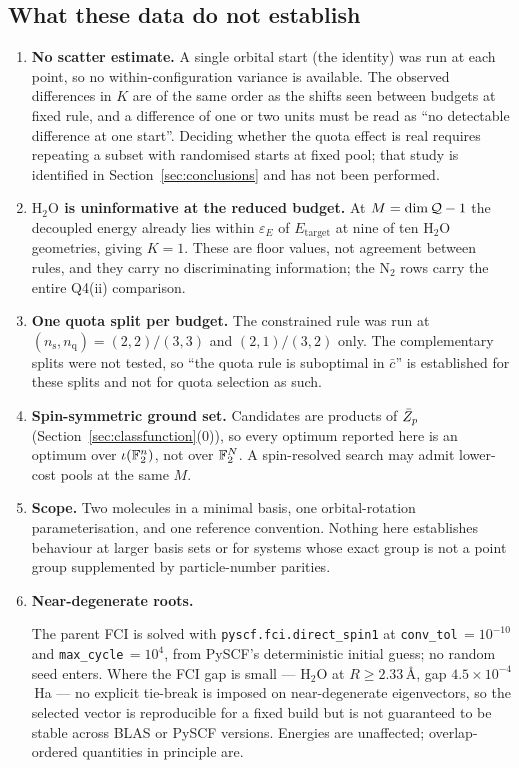\subsection{What these data do not establish}
\label{sec:q4limits}

\begin{enumerate}
\item \textbf{No scatter estimate.} A single orbital start (the identity) was
run at each point, so no within-configuration variance is available. The
observed differences in $K$ are of the same order as the shifts seen between
budgets at fixed rule, and a difference of one or two units must be read as
``no detectable difference at one start''. Deciding whether the quota effect is
real requires repeating a subset with randomised starts at fixed pool; that
study is identified in Section~\ref{sec:conclusions} and has not been performed.
\item \textbf{$\mathrm{H_2O}$ is uninformative at the reduced budget.} At
$M=\dim\mathcal Q-1$ the decoupled energy already lies within $\varepsilon_E$ of
$E_{\mathrm{target}}$ at nine of ten $\mathrm{H_2O}$ geometries, giving $K=1$. These
are floor values, not agreement between rules, and they carry no discriminating
information; the $\mathrm{N_2}$ rows carry the entire Q4(ii) comparison.
\item \textbf{One quota split per budget.} The constrained rule was run at
$(n_{\mathrm{s}},n_{\mathrm{q}})=(2,2)/(3,3)$ and $(2,1)/(3,2)$ only. The
complementary splits were not tested, so ``the quota rule is suboptimal in
$\bar c$'' is established for these splits and not for quota selection as such.
\item \textbf{Spin-symmetric ground set.} Candidates are products of $\bar Z_p$
(Section~\ref{sec:classfunction}(0)), so every optimum reported here is an
optimum over $\iota(\mathbb F_2^{n})$, not over $\mathbb F_2^{N}$. A spin-resolved search may
admit lower-cost pools at the same $M$.
\item \textbf{Scope.} Two molecules in a minimal basis, one orbital-rotation
parameterisation, and one reference convention. Nothing here establishes
behaviour at larger basis sets or for systems whose exact group is not a point
group supplemented by particle-number parities.
\item \textbf{Near-degenerate roots.}\begin{sloppypar}
The parent FCI is solved with \texttt{pyscf.fci.direct\_spin1} at
\texttt{conv\_tol}\,$=10^{-10}$ and \texttt{max\_cycle}\,$=10^{4}$, from
PySCF's deterministic initial guess; no
random seed enters. Where the FCI gap is small --- $\mathrm{H_2O}$ at
$R\ge2.33$\,\AA, gap $4.5\times10^{-4}$\,Ha --- no explicit tie-break is
imposed on near-degenerate eigenvectors, so the selected vector is reproducible
for a fixed build but is not guaranteed to be stable across BLAS or PySCF
versions. Energies are unaffected; overlap-ordered quantities in principle are.
\end{sloppypar}
\end{enumerate}
